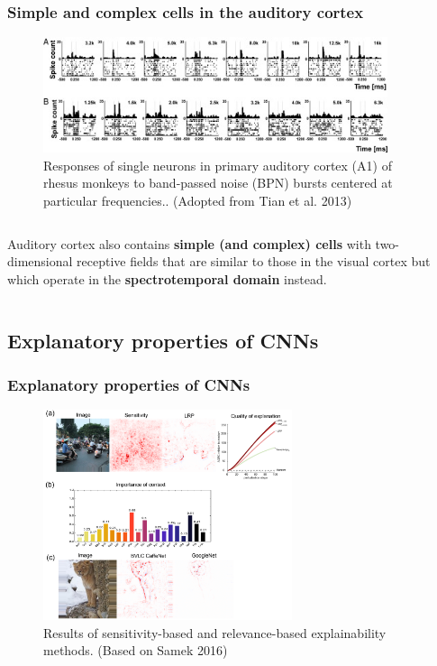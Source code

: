 \documentclass[a4paper,9pt]{beamer}
\theoremstyle{mytheoremstyle}
\begin{document}
\begin{frame}
\frametitle{Simple and complex cells in the auditory cortex}
\begin{figure}
\begin{center}
  \includegraphics[width=0.9\textwidth]{res/simple_cells_auditory_cortes.png}
\end{center}
	\caption{Responses of single neurons in primary auditory cortex (A1) of rhesus monkeys to band-passed noise (BPN) bursts centered at particular frequencies.. (Adopted from Tian et al. 2013)}
\end{figure}
\begin{columns}
\scriptsize{
\begin{exampleblock}{}
Auditory cortex also contains \textbf{simple (and complex) cells} with two-dimensional receptive fields that are similar to those in the visual cortex but which operate in the \textbf{spectrotemporal domain} instead.
\end{exampleblock}
}
\end{columns}
\end{frame}

\subsection{Explanatory properties of CNNs}

\begin{frame}
\frametitle{Explanatory properties of CNNs}
\begin{figure}
\begin{center}
  \includegraphics[width=0.65\textwidth]{res/sensitivity_vs_relevance}
\end{center}
	\caption{Results of sensitivity-based and relevance-based explainability methods. (Based on Samek 2016)}
\end{figure}
\end{frame}
\end{document}

